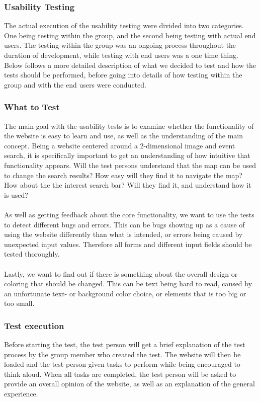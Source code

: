 \subsubsection{Usability Testing} The actual execution of the usability testing were divided into two categories. One being testing within the group, and the second being testing with actual end users. The testing within the group was an ongoing process throughout the duration of development, while testing with end users was a one time thing. Below follows a more detailed description of what we decided to test and how the tests should be performed, before going into details of how testing within the group and with the end users were conducted.

\subsubsection{What to Test} The main goal with the usability tests is to examine whether the functionality of the website is easy to learn and use, as well as the understanding of the main concept. Being a website centered around a 2-dimensional image and event search, it is specifically important to get an understanding of how intuitive that functionality appears. Will the test persons understand that the map can be used to change the search results? How easy will they find it to navigate the map? How about the the interest search bar? Will they find it, and understand how it is used?

\paragraph{} As well as getting feedback about the core functionality, we want to use the tests to detect different bugs and errors. This can be bugs showing up as a cause of using the website differently than what is intended, or errors being caused by unexpected input values. Therefore all forms and different input fields should be tested thoroughly.

\paragraph{} Lastly, we want to find out if there is something about the overall design or coloring that should be changed. This can be text being hard to read, caused by an unfortunate text- or background color choice, or elements that is too big or too small.  

\subsubsection{Test execution} Before starting the test, the test person will get a brief explanation of the test process by the group member who created the test. The website will then be loaded and the test person given tasks to perform while being encouraged to think aloud. When all tasks are completed, the test person will be asked to provide an overall opinion of the website, as well as an explanation of the general experience.

